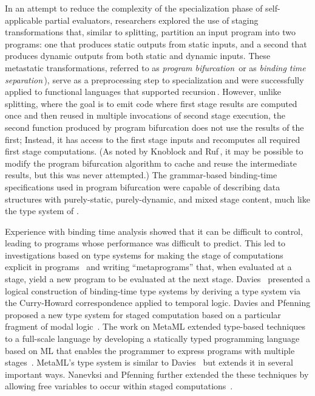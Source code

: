 In an attempt to reduce the complexity of the specialization phase of
self-applicable partial evaluators, researchers explored the use of
staging transformations that, similar to splitting, partition an input
program into two programs: one that produces static outputs from
static inputs, and a second that produces dynamic outputs from both
static and dynamic inputs.  These metastatic transformations, referred
to as \emph{program bifurcation}\,\cite{DeNiel91} or as \emph{binding
  time separation}\,\cite{Mogensen89a}), serve as a preprocessing step
to specialization and were successfully applied to functional
languages that supported recursion\,\cite{DeNiel91}. However, unlike
splitting, where the goal is to emit code where first stage results
are computed once and then reused in multiple invocations of second
stage execution, the second function produced by program bifurcation
does not use the results of the first; Instead,
it has access to the first stage inputs and recomputes all required
first stage computations. (As noted by Knoblock and
Ruf\,\cite{knoblock96}, it may be possible to modify the program
bifurcation algorithm to cache and reuse the intermediate results, but
this was never attempted.) The grammar-based binding-time
specifications used in program bifurcation were capable of describing
data structures with purely-static, purely-dynamic, and mixed stage
content, much like the type system of \lang.

Experience with binding time analysis showed that it can be difficult
to control, leading to programs whose performance was difficult to
predict. This led to investigations based on type systems for making
the stage of computations explicit in
programs~\cite{GJ91-lambda,NN92-twolevel} and writing ``metaprograms''
that, when evaluated at a stage, yield a new program to be evaluated
at the next stage.  Davies~\cite{davies96} presented a logical
construction of binding-time type systems by deriving a type system
via the Curry-Howard correspondence applied to temporal logic.  Davies
and Pfenning proposed a new type system for staged computation based
on a particular fragment of modal logic~\cite{DP01-modal}. The work on
MetaML extended type-based techniques to a full-scale language by
developing a statically typed programming language based on ML that
enables the programmer to express programs with multiple
stages~\cite{Taha97,taha-thesis-99}.  MetaML's type system is similar
to Davies~\cite{davies96} but extends it in several important ways.
Nanevksi and Pfenning further extended the these techniques by
allowing free variables to occur within staged
computations~\cite{NP05-nn}.

